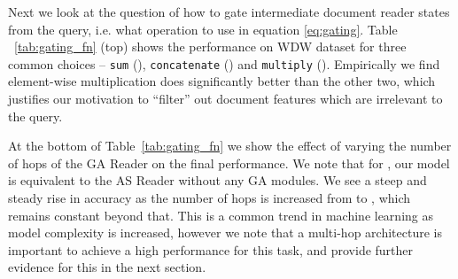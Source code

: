 \documentclass[11pt,a4paper]{article}
\begin{document}
Next we look at the question of how to gate intermediate document reader states from the query, i.e. what operation to use in equation \ref{eq:gating}. Table ~\ref{tab:gating_fn} (top) shows the performance on WDW dataset for three common choices -- \texttt{sum} (), \texttt{concatenate} () and \texttt{multiply} (). Empirically we find element-wise multiplication does significantly better than the other two, which justifies our motivation to ``filter'' out document features which are irrelevant to the query.

At the bottom of Table~\ref{tab:gating_fn} we show the effect of varying the number of hops  of the GA Reader on the final performance. We note that for , our model is equivalent to the AS Reader without any GA modules. We see a steep and steady rise in accuracy as the number of hops is increased from  to , which remains constant beyond that. This is a common trend in machine learning as model complexity is increased, however we note that a multi-hop architecture is important to achieve a high performance for this task, and provide further evidence for this in the next section.
\end{document}
